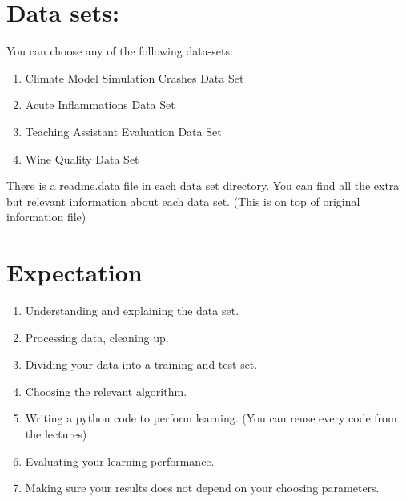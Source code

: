 \documentclass[12pt,letterpaper]{article}
\begin{document}
\section*{Data sets:}
You can choose any of the following data-sets:

\begin{enumerate}
\item Climate Model Simulation Crashes Data Set 

\item Acute Inflammations Data Set 

\item Teaching Assistant Evaluation Data Set 


\item Wine Quality Data Set 
\end{enumerate}

There is a readme.data file in each data set directory. You can find all the extra but relevant information about each data set. (This is on top of original information file)

\section*{Expectation}
\begin{enumerate}
\item Understanding and explaining the data set.

\item Processing data, cleaning up. 

\item Dividing your data into a training and test set. 

\item Choosing the relevant algorithm.

\item Writing a python code to perform learning. (You can reuse every code from the lectures)

\item Evaluating your learning performance. 

\item Making sure your results does not depend on your choosing parameters.
\end{enumerate}
\end{document}
